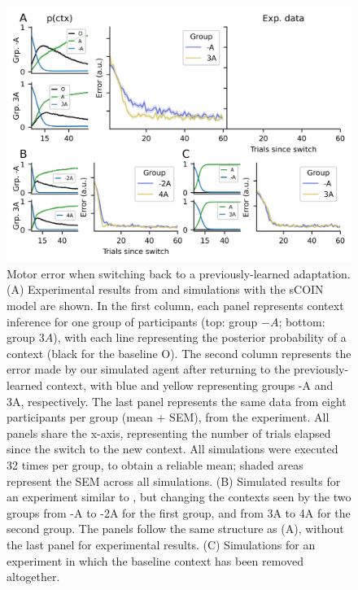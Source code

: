 \documentclass[a4paper,doc,floatsintext,natbib]{apa6}
\begin{document}
\begin{figure}
\centering
\includegraphics{./figures/figure_3.png}
\caption{Motor error when switching back to a previously-learned adaptation. (A) Experimental results from \cite{Davidson_Scaling_2004} and simulations with the sCOIN model are shown. In the first column, each panel represents context inference for one group of participants (top: group $-A$; bottom: group $3A$), with each line representing the posterior probability of a context (black for the baseline O). The second column represents the error made by our simulated agent after returning to the previously-learned context, with blue and yellow representing groups -A and 3A, respectively. The last panel represents the same data from eight participants per group (mean + SEM), from the \cite{Davidson_Scaling_2004} experiment. All panels share the x-axis, representing the number of trials elapsed since the switch to the new context. All simulations were executed 32 times per group, to obtain a reliable mean; shaded areas represent the SEM across all simulations. (B) Simulated results for an experiment similar to \cite{Davidson_Scaling_2004}, but changing the contexts seen by the two groups from -A to -2A for the first group, and from 3A to 4A for the second group. The panels follow the same structure as (A), without the last panel for experimental results. (C) Simulations for an experiment in which the baseline context has been removed altogether.}
\label{fig:davidson-2004}
\end{figure}
\end{document}
